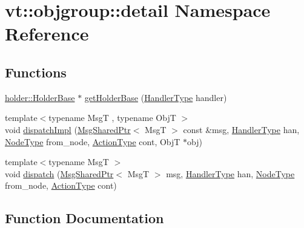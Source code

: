 \hypertarget{namespacevt_1_1objgroup_1_1detail}{}\section{vt\+:\+:objgroup\+:\+:detail Namespace Reference}
\label{namespacevt_1_1objgroup_1_1detail}
\subsection*{Functions}
\begin{DoxyCompactItemize}
\item 
\hyperlink{structvt_1_1objgroup_1_1holder_1_1_holder_base}{holder\+::\+Holder\+Base} $\ast$ \hyperlink{namespacevt_1_1objgroup_1_1detail_a8f4e9c94566b84be869adfeca53fc784}{get\+Holder\+Base} (\hyperlink{namespacevt_af64846b57dfcaf104da3ef6967917573}{Handler\+Type} handler)
\item 
{\footnotesize template$<$typename MsgT , typename ObjT $>$ }\\void \hyperlink{namespacevt_1_1objgroup_1_1detail_af0051871ce5fab12ba4d290c70d55537}{dispatch\+Impl} (\hyperlink{namespacevt_ab2b3d506ec8e8d1540aede826d84a239}{Msg\+Shared\+Ptr}$<$ MsgT $>$ const \&msg, \hyperlink{namespacevt_af64846b57dfcaf104da3ef6967917573}{Handler\+Type} han, \hyperlink{namespacevt_a866da9d0efc19c0a1ce79e9e492f47e2}{Node\+Type} from\+\_\+node, \hyperlink{namespacevt_ae0a5a7b18cc99d7b732cb4d44f46b0f3}{Action\+Type} cont, ObjT $\ast$obj)
\item 
{\footnotesize template$<$typename MsgT $>$ }\\void \hyperlink{namespacevt_1_1objgroup_1_1detail_a153e8f0764f428227b76c57dda4d7f56}{dispatch} (\hyperlink{namespacevt_ab2b3d506ec8e8d1540aede826d84a239}{Msg\+Shared\+Ptr}$<$ MsgT $>$ msg, \hyperlink{namespacevt_af64846b57dfcaf104da3ef6967917573}{Handler\+Type} han, \hyperlink{namespacevt_a866da9d0efc19c0a1ce79e9e492f47e2}{Node\+Type} from\+\_\+node, \hyperlink{namespacevt_ae0a5a7b18cc99d7b732cb4d44f46b0f3}{Action\+Type} cont)
\end{DoxyCompactItemize}


\subsection{Function Documentation}
\mbox{\label{namespacevt_1_1objgroup_1_1detail_a153e8f0764f428227b76c57dda4d7f56}} 
